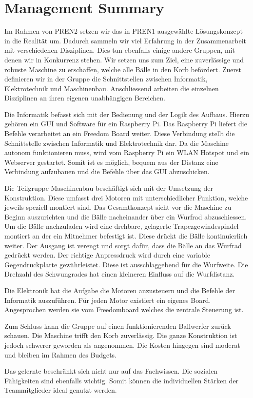 \section{Management Summary}

Im Rahmen von PREN2 setzen wir das in PREN1 ausgewählte Lösungskonzept in die Realität um. Dadurch sammeln wir viel Erfahrung in der Zusammenarbeit mit verschiedenen Disziplinen. Dies tun ebenfalls einige andere Gruppen, mit denen wir in Konkurrenz stehen. Wir setzen uns zum Ziel, eine zuverlässige und robuste Maschine zu erschaffen, welche alle Bälle in den Korb befördert.
Zuerst definieren wir in der Gruppe die Schnittstellen zwischen Informatik, Elektrotechnik und Maschinenbau. Anschliessend arbeiten die einzelnen Disziplinen an ihren eigenen unabhängigen Bereichen.

Die Informatik befasst sich mit der Bedienung und der Logik des Aufbaus. Hierzu gehören ein GUI und Software für ein Raspberry Pi. Das Raspberry Pi liefert die Befehle verarbeitet an ein Freedom Board weiter. Diese Verbindung stellt die Schnittstelle zwischen Informatik und Elektrotechnik dar. Da die Maschine autonom funktionieren muss, wird vom Raspberry Pi ein WLAN Hotspot und ein Webserver gestartet. Somit ist es möglich, bequem aus der Distanz eine Verbindung aufzubauen und die Befehle über das GUI abzuschicken.

Die Teilgruppe Maschinenbau beschäftigt sich mit der Umsetzung der Konstruktion. Diese umfasst drei Motoren mit unterschiedlicher Funktion, welche jeweils speziell montiert sind. Das Gesamtkonzept sieht vor die Maschine zu Beginn auszurichten und die Bälle nacheinander über ein Wurfrad abzuschiessen. Um die Bälle nachzuladen wird eine drehbare, gelagerte Trapezgewindespindel montiert an der ein Mitnehmer befestigt ist. Diese drückt die Bälle kontinuierlich weiter. Der Ausgang ist verengt und sorgt dafür, dass die Bälle an das Wurfrad gedrückt werden. Der richtige Anpressdruck wird durch eine variable Gegendruckplatte gewährleistet. Diese ist ausschlaggebend für die Wurfweite. Die Drehzahl des Schwungrades hat einen kleineren Einfluss auf die Wurfdistanz.

Die Elektronik hat die Aufgabe die Motoren anzusteuern und die Befehle der Informatik auszuführen.
Für jeden Motor existiert ein eigenes Board. Angesprochen werden sie vom Freedomboard welches die zentrale Steuerung ist.

Zum Schluss kann die Gruppe auf einen funktionierenden Ballwerfer zurück schauen. Die Maschine trifft den Korb zuverlässig. Die ganze Konstruktion ist jedoch schwerer geworden als angenommen. Die Kosten hingegen sind moderat und bleiben im Rahmen des Budgets.

Das gelernte beschränkt sich nicht nur auf das Fachwissen. Die sozialen Fähigkeiten sind ebenfalls wichtig. Somit können die individuellen Stärken der Teammitglieder ideal genutzt werden.